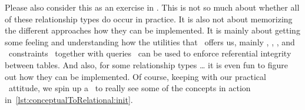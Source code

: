 Please also consider this as an exercise in \sql.
This is not so much about whether all of these relationship types do occur in practice.
It is also not about memorizing the different approaches how they can be implemented.
It is mainly about getting some feeling and understanding how the utilities that \sql\ offers us, mainly , , , and ~constraints~\cite{PGDG:PD:C} together with  queries~\cite{PGDG:PD:JT} can be used to enforce referential integrity between tables.
And also, for some relationship types {\dots} it is even fun to figure out how they can be implemented.%
%
%
%
Of course, keeping with our practical ~attitude, we spin up a \db\ to really see some of the concepts in action in~\cref{lst:conceptualToRelational:init}.%
%
%
%
\FloatBarrier%
